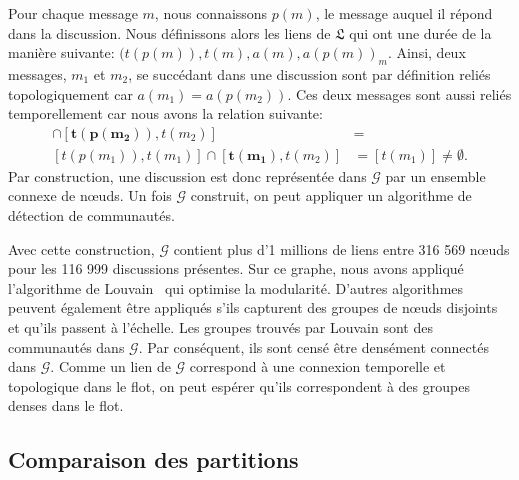 Pour chaque message $m$, nous connaissons $p(m)$, le message auquel il répond dans la discussion.
Nous définissons alors les liens de $\mathfrak{L}$ qui ont une durée de la manière suivante: ${(t(p(m)),t(m),a(m),a(p(m))}_m$.
Ainsi, deux messages, $m_1$ et $m_2$, se succédant dans une discussion sont par définition reliés topologiquement car $a(m_1)= a(p(m_2))$.
Ces deux messages sont aussi reliés temporellement car  nous avons la relation suivante:
\begin{align*}
[t(p(m_1)),t(m_1)]\cap [\mathbf{t(p(m_2))},t(m_2)] &= \\
[t(p(m_1)),t(m_1)]\cap [\mathbf{t(m_1)},t(m_2)] &= [t(m_1)] \neq \emptyset.
\end{align*}
Par construction, une discussion est donc représentée dans $\mathcal{G}$ par un ensemble connexe de n\oe uds.
Un fois $\mathcal{G}$ construit, on peut appliquer un algorithme de détection de communautés.

Avec cette construction, $\mathcal{G}$ contient plus d'1 millions de liens entre 316 569 n\oe uds pour les 116 999 discussions présentes.
Sur ce graphe, nous avons appliqué l'algorithme de Louvain~\cite{Blondel2008a} qui optimise la modularité.
D'autres algorithmes peuvent également être appliqués s'ils capturent des groupes de n\oe uds disjoints et qu'ils passent à l'échelle.
Les groupes trouvés par Louvain sont des communautés dans $\mathcal{G}$.
Par conséquent, ils sont censé être densément connectés dans $\mathcal{G}$.
Comme un lien de $\mathcal{G}$ correspond à une connexion temporelle et topologique dans le flot, on peut espérer qu'ils correspondent à des groupes denses dans le flot.

\subsection{Comparaison des partitions}

